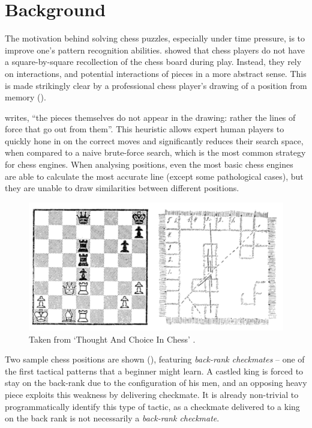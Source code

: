 \chapter{Background}\label{backgroundChapter}

The motivation behind solving chess puzzles, especially under time pressure, is
to improve one's pattern recognition abilities. \citet{thoughtAndChoice} showed
that chess players do not have a square-by-square recollection of the chess
board during play. Instead, they rely on interactions, and potential
interactions of pieces in a more abstract sense. This is made strikingly clear
by a professional chess player's drawing of a position from memory
().

\citet{thoughtAndChoice} writes, ``the pieces themselves do not appear in the
drawing: rather the lines of force that go out from them''. This heuristic
allows expert human players to quickly hone in on the correct moves
\citep{bilalic2010mechanisms} and significantly reduces their search space,
when compared to a naive brute-force search, which is the most common strategy
for chess engines. When analysing positions, even the most basic chess engines
are able to calculate the most accurate line (except some pathological cases),
but they are unable to draw similarities between different positions.

\begin{figure}[H]
  \centering
  \includegraphics[width=0.9\linewidth]{background/img/deGroot.png}
  \caption{Taken from `Thought And Choice In Chess'
  \citep{thoughtAndChoice}.}
  \label{deGrootFigure}
\end{figure}

Two sample chess positions are shown (), featuring
\emph{back-rank checkmates} -- one of the first tactical patterns that a
beginner might learn. A castled king is forced to stay on the back-rank due to
the configuration of his men, and an opposing heavy piece exploits this
weakness by delivering checkmate. It is already non-trivial to programmatically
identify this type of tactic, as a checkmate delivered to a king on the back
rank is not necessarily a \emph{back-rank checkmate}.

